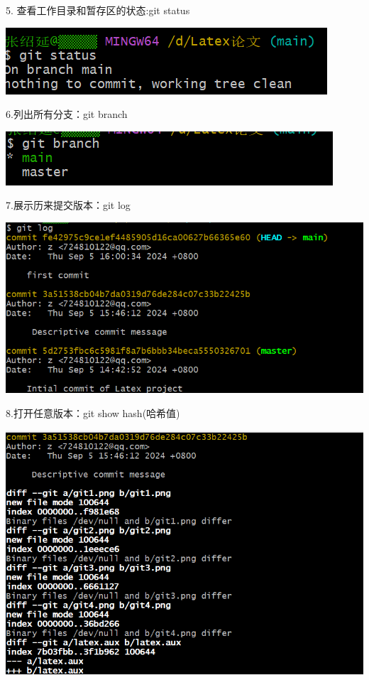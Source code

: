 \documentclass{article}
\begin{document}
5.
查看工作目录和暂存区的状态:git status

\noindent
\begin{minipage}{\linewidth}
 \centering
  \includegraphics[width=0.5\linewidth]{git5.png}
  \label{fig:example}
\end{minipage}

6.列出所有分支：git branch

\noindent
\begin{minipage}{\linewidth}
 \centering
  \includegraphics[width=0.5\linewidth]{git6.png}
  \label{fig:example}
\end{minipage}

7.展示历来提交版本：git log

\noindent
\begin{minipage}{\linewidth}
 \centering
  \includegraphics[width=0.5\linewidth]{git7.png}
  \label{fig:example}
\end{minipage}

8.打开任意版本：git show hash(哈希值)

\noindent
\begin{minipage}{\linewidth}
 \centering
  \includegraphics[width=0.5\linewidth]{git8.png}
  \label{fig:example}
\end{minipage}
\end{document}
